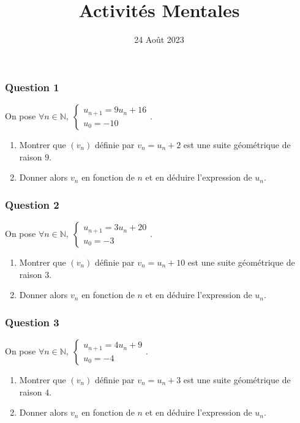 \documentclass[15pt, mathserif]{beamer}
\title{Activités Mentales}
\date{24 Août 2023}
\begin{document}
\begin{frame}
    \titlepage
\end{frame}

\begin{frame} 
	\frametitle{Question 1}


On pose $\forall n \in \mathbb{N}, \;\begin{cases} u_{n+1} = 9u_n+16 \\ u_0 = -10\end{cases}$.

\begin{enumerate}
	\item Montrer que $(v_n)$ définie par $v_n = u_n+2$ est une suite géométrique de raison $9$.

	\item Donner alors $v_n$ en fonction de $n$ et en déduire l'expression de $u_n$.

\end{enumerate}\end{frame}


\begin{frame} 
	\frametitle{Question 2}


On pose $\forall n \in \mathbb{N}, \;\begin{cases} u_{n+1} = 3u_n+20 \\ u_0 = -3\end{cases}$.

\begin{enumerate}
	\item Montrer que $(v_n)$ définie par $v_n = u_n+10$ est une suite géométrique de raison $3$.

	\item Donner alors $v_n$ en fonction de $n$ et en déduire l'expression de $u_n$.

\end{enumerate}\end{frame}


\begin{frame} 
	\frametitle{Question 3}


On pose $\forall n \in \mathbb{N}, \;\begin{cases} u_{n+1} = 4u_n+9 \\ u_0 = -4\end{cases}$.

\begin{enumerate}
	\item Montrer que $(v_n)$ définie par $v_n = u_n+3$ est une suite géométrique de raison $4$.

	\item Donner alors $v_n$ en fonction de $n$ et en déduire l'expression de $u_n$.

\end{enumerate}\end{frame}
\end{document}
